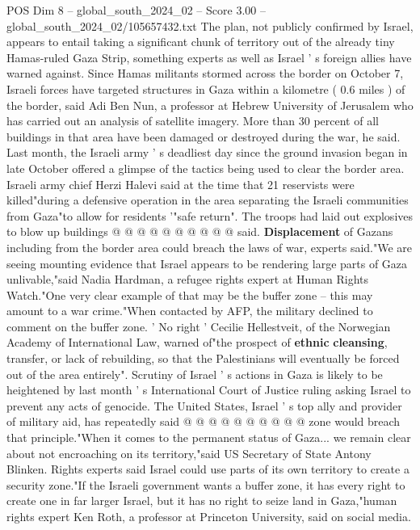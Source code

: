 \begin{textsample}{POS Dim 8 – global\_south\_2024\_02 – Score 3.00 – global\_south\_2024\_02/105657432.txt}  \label{ex:f8_pos_386}
The plan, not publicly confirmed by Israel, appears to entail taking a significant chunk of territory out of the already tiny Hamas-ruled Gaza Strip, something experts as well as Israel ' s foreign allies have warned against.
Since Hamas militants stormed across the border on October 7, Israeli forces have targeted structures in Gaza within a kilometre ( 0.6 miles ) of the border, said Adi Ben Nun, a professor at Hebrew University of Jerusalem who has carried out an analysis of satellite imagery.
More than 30 percent of all buildings in that area have been damaged or destroyed during the war, he said.
Last month, the Israeli army ' s deadliest day since the ground invasion began in late October offered a glimpse of the tactics being used to clear the border area.
Israeli army chief Herzi Halevi said at the time that 21 reservists were killed"during a defensive operation in the area separating the Israeli communities from Gaza"to allow for residents '"safe return".
The troops had laid out explosives to blow up buildings @ @ @ @ @ @ @ @ @ @ said. \textbf{Displacement} of Gazans including from the border area could breach the laws of war, experts said."We are seeing mounting evidence that Israel appears to be rendering large parts of Gaza unlivable,"said Nadia Hardman, a refugee rights expert at Human Rights Watch."One very clear example of that may be the buffer zone -- this may amount to a war crime."When contacted by AFP, the military declined to comment on the buffer zone. ' No right ' Cecilie Hellestveit, of the Norwegian Academy of International Law, warned of"the prospect of \textbf{ethnic} \textbf{cleansing}, transfer, or lack of rebuilding, so that the Palestinians will eventually be forced out of the area entirely".
Scrutiny of Israel ' s actions in Gaza is likely to be heightened by last month ' s International Court of Justice ruling asking Israel to prevent any acts of genocide.
The United States, Israel ' s top ally and provider of military aid, has repeatedly said @ @ @ @ @ @ @ @ @ @ zone would breach that principle."When it comes to the permanent status of Gaza... we remain clear about not encroaching on its territory,"said US Secretary of State Antony Blinken.
Rights experts said Israel could use parts of its own territory to create a security zone."If the Israeli government wants a buffer zone, it has every right to create one in far larger Israel, but it has no right to seize land in Gaza,"human rights expert Ken Roth, a professor at Princeton University, said on social media.

\end{textsample}
